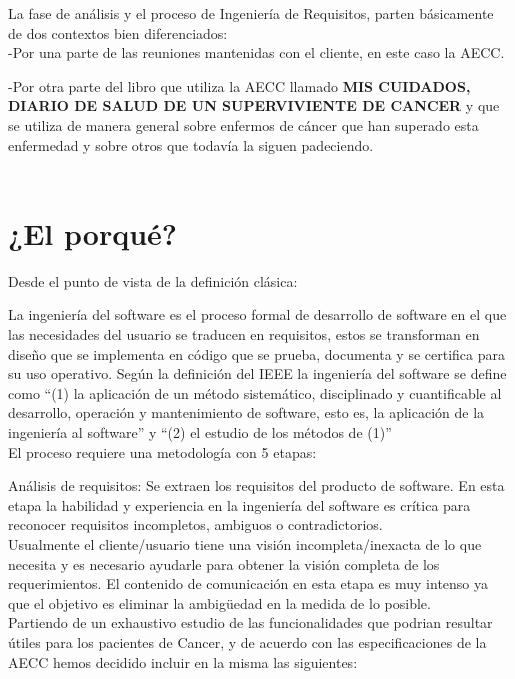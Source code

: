 \documentclass[../pfc.tex]{subfiles}
\begin{document}
	
La fase de análisis y el proceso de Ingeniería de Requisitos, parten básicamente de dos contextos bien diferenciados:\\
-Por una parte de las reuniones mantenidas con el cliente, en este caso la AECC.

-Por otra parte del libro que utiliza la AECC llamado \textbf{MIS CUIDADOS, DIARIO DE SALUD DE UN SUPERVIVIENTE DE CANCER} y que se utiliza de manera general sobre enfermos de cáncer que han superado esta enfermedad y sobre otros que todavía la siguen padeciendo.\\\\
	
	\section{¿El porqué?}
	
	Desde el punto de vista de la definición clásica:
	
	La ingeniería del software es el proceso formal de desarrollo de software en el que las necesidades del usuario se traducen en requisitos, estos se transforman en diseño que se implementa en código que se prueba, documenta y se certifica para su uso operativo. Según la definición del IEEE la ingeniería del software se define como “(1) la aplicación de un método sistemático, disciplinado y cuantificable al desarrollo, operación y mantenimiento de software, esto es, la aplicación de la ingeniería al software” y “(2) el estudio de los métodos de (1)”\\
	
	El proceso requiere una metodología con 5 etapas:
	
	Análisis de requisitos: Se extraen los requisitos del producto de software. En esta etapa la habilidad y experiencia en la ingeniería del software es crítica para reconocer requisitos incompletos, ambiguos o contradictorios.\\
	Usualmente el cliente/usuario tiene una visión incompleta/inexacta de lo que necesita y es necesario ayudarle para obtener la visión completa de los requerimientos.  El contenido de comunicación en esta etapa es muy intenso ya que el objetivo es eliminar la ambigüedad en la medida de lo posible.\\
	Partiendo de un exhaustivo estudio de las funcionalidades que podrian resultar útiles para los pacientes de Cancer, y de acuerdo con las especificaciones de la AECC hemos decidido incluir en la misma las siguientes:\\
\end{document}
